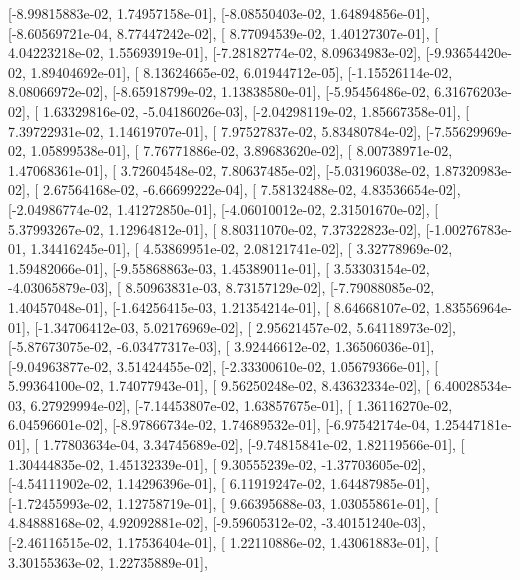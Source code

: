 \documentclass{article}
\begin{document}
       [-8.99815883e-02,  1.74957158e-01],
       [-8.08550403e-02,  1.64894856e-01],
       [-8.60569721e-04,  8.77447242e-02],
       [ 8.77094539e-02,  1.40127307e-01],
       [ 4.04223218e-02,  1.55693919e-01],
       [-7.28182774e-02,  8.09634983e-02],
       [-9.93654420e-02,  1.89404692e-01],
       [ 8.13624665e-02,  6.01944712e-05],
       [-1.15526114e-02,  8.08066972e-02],
       [-8.65918799e-02,  1.13838580e-01],
       [-5.95456486e-02,  6.31676203e-02],
       [ 1.63329816e-02, -5.04186026e-03],
       [-2.04298119e-02,  1.85667358e-01],
       [ 7.39722931e-02,  1.14619707e-01],
       [ 7.97527837e-02,  5.83480784e-02],
       [-7.55629969e-02,  1.05899538e-01],
       [ 7.76771886e-02,  3.89683620e-02],
       [ 8.00738971e-02,  1.47068361e-01],
       [ 3.72604548e-02,  7.80637485e-02],
       [-5.03196038e-02,  1.87320983e-02],
       [ 2.67564168e-02, -6.66699222e-04],
       [ 7.58132488e-02,  4.83536654e-02],
       [-2.04986774e-02,  1.41272850e-01],
       [-4.06010012e-02,  2.31501670e-02],
       [ 5.37993267e-02,  1.12964812e-01],
       [ 8.80311070e-02,  7.37322823e-02],
       [-1.00276783e-01,  1.34416245e-01],
       [ 4.53869951e-02,  2.08121741e-02],
       [ 3.32778969e-02,  1.59482066e-01],
       [-9.55868863e-03,  1.45389011e-01],
       [ 3.53303154e-02, -4.03065879e-03],
       [ 8.50963831e-03,  8.73157129e-02],
       [-7.79088085e-02,  1.40457048e-01],
       [-1.64256415e-03,  1.21354214e-01],
       [ 8.64668107e-02,  1.83556964e-01],
       [-1.34706412e-03,  5.02176969e-02],
       [ 2.95621457e-02,  5.64118973e-02],
       [-5.87673075e-02, -6.03477317e-03],
       [ 3.92446612e-02,  1.36506036e-01],
       [-9.04963877e-02,  3.51424455e-02],
       [-2.33300610e-02,  1.05679366e-01],
       [ 5.99364100e-02,  1.74077943e-01],
       [ 9.56250248e-02,  8.43632334e-02],
       [ 6.40028534e-03,  6.27929994e-02],
       [-7.14453807e-02,  1.63857675e-01],
       [ 1.36116270e-02,  6.04596601e-02],
       [-8.97866734e-02,  1.74689532e-01],
       [-6.97542174e-04,  1.25447181e-01],
       [ 1.77803634e-04,  3.34745689e-02],
       [-9.74815841e-02,  1.82119566e-01],
       [ 1.30444835e-02,  1.45132339e-01],
       [ 9.30555239e-02, -1.37703605e-02],
       [-4.54111902e-02,  1.14296396e-01],
       [ 6.11919247e-02,  1.64487985e-01],
       [-1.72455993e-02,  1.12758719e-01],
       [ 9.66395688e-03,  1.03055861e-01],
       [ 4.84888168e-02,  4.92092881e-02],
       [-9.59605312e-02, -3.40151240e-03],
       [-2.46116515e-02,  1.17536404e-01],
       [ 1.22110886e-02,  1.43061883e-01],
       [ 3.30155363e-02,  1.22735889e-01],
\end{document}
